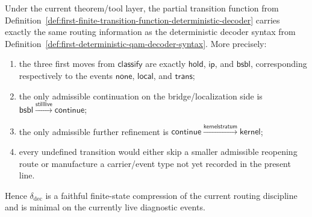 \begin{proposition}
\label{prop:finite-transition-function-equivalent-deterministic-decoder-syntax}
Under the current theorem/tool layer, the partial transition function from Definition~\ref{def:first-finite-transition-function-deterministic-decoder} carries exactly the same routing information as the deterministic decoder syntax from Definition~\ref{def:first-deterministic-qam-decoder-syntax}. More precisely:
\begin{enumerate}[label=(\roman*)]
    \item the three first moves from \(\mathsf{classify}\) are exactly \(\mathsf{hold}\), \(\mathsf{ip}\), and \(\mathsf{bsbl}\), corresponding respectively to the events \(\mathsf{none}\), \(\mathsf{local}\), and \(\mathsf{trans}\);
    \item the only admissible continuation on the bridge/localization side is \(\mathsf{bsbl}\xrightarrow{\mathsf{stilllive}}\mathsf{continue}\);
    \item the only admissible further refinement is \(\mathsf{continue}\xrightarrow{\mathsf{kernelstratum}}\mathsf{kernel}\);
    \item every undefined transition would either skip a smaller admissible reopening route or manufacture a carrier/event type not yet recorded in the present line.
\end{enumerate}
Hence \(\delta_{\mathrm{dec}}\) is a faithful finite-state compression of the current routing discipline and is minimal on the currently live diagnostic events.
\end{proposition}

